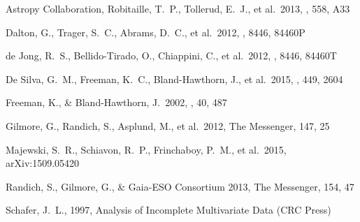 \documentclass{aastex61}
\begin{document}
\begin{thebibliography}{}




 Astropy Collaboration, Robitaille, T.~P., Tollerud, E.~J., et al.\ 2013, \aap, 558, A33 %

 Dalton, G., Trager, S.~C., Abrams, D.~C., et al.\ 2012, \procspie, 8446, 84460P %

 de Jong, R.~S., Bellido-Tirado, O., Chiappini, C., et al.\ 2012, \procspie, 8446, 84460T %

 De Silva, G.~M., Freeman, K.~C., Bland-Hawthorn, J., et al.\ 2015, \mnras, 449, 2604 %

 Freeman, K., \& Bland-Hawthorn, J.\ 2002, \araa, 40, 487 %

 Gilmore, G., Randich, S., Asplund, M., et al.\ 2012, The Messenger, 147, 25 %

 Majewski, S.~R., Schiavon, R.~P., Frinchaboy, P.~M., et al.\ 2015, arXiv:1509.05420 %

 Randich, S., Gilmore, G., \& Gaia-ESO Consortium 2013, The Messenger, 154, 47 %

 Schafer, J.~L., 1997, Analysis of Incomplete Multivariate Data (CRC Press) %

\end{thebibliography}
\end{document}
